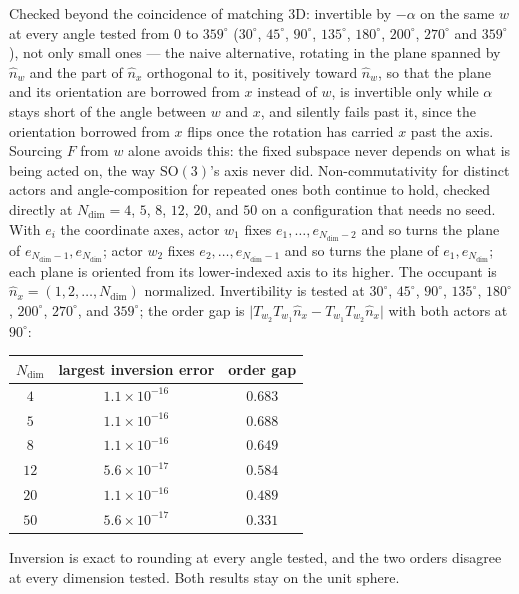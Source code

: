 \documentclass[12pt, a4paper]{article}
\begin{document}
Checked beyond the coincidence of matching 3D: invertible by $-\alpha$ on the same $w$ at every angle tested from $0$ to $359^\circ$ ($30^\circ$, $45^\circ$, $90^\circ$, $135^\circ$, $180^\circ$, $200^\circ$, $270^\circ$ and $359^\circ$), not only small ones --- the naive alternative, rotating in the plane spanned by $\hat n_w$ and the part of $\hat n_x$ orthogonal to it, positively toward $\hat n_w$, so that the plane and its orientation are borrowed from $x$ instead of $w$, is invertible only while $\alpha$ stays short of the angle between $w$ and $x$, and silently fails past it, since the orientation borrowed from $x$ flips once the rotation has carried $x$ past the axis. Sourcing $F$ from
$w$ alone avoids this: the fixed subspace never depends on what is
being acted on, the way $\mathrm{SO}(3)$'s axis never did.
Non-commutativity for distinct actors and angle-composition for
repeated ones both continue to hold, checked directly at
$N_{\mathrm{dim}}=4$, $5$, $8$, $12$, $20$, and $50$ on a
configuration that needs no seed. With $e_i$ the coordinate axes, actor $w_1$ fixes
$e_1,\ldots,e_{N_{\mathrm{dim}}-2}$ and so turns the plane of
$e_{N_{\mathrm{dim}}-1},e_{N_{\mathrm{dim}}}$; actor $w_2$ fixes
$e_2,\ldots,e_{N_{\mathrm{dim}}-1}$ and so turns the plane of
$e_1,e_{N_{\mathrm{dim}}}$; each plane is oriented from its
lower-indexed axis to its higher. The occupant is
$\hat n_x=(1,2,\ldots,N_{\mathrm{dim}})$ normalized. Invertibility is
tested at $30^\circ$, $45^\circ$, $90^\circ$, $135^\circ$,
$180^\circ$, $200^\circ$, $270^\circ$, and $359^\circ$; the order
gap is $\lvert T_{w_2}T_{w_1}\hat n_x-T_{w_1}T_{w_2}\hat n_x\rvert$
with both actors at $90^\circ$:
\begin{center}
\begin{tabular}{ccc}
$N_{\mathrm{dim}}$ & largest inversion error & order gap \\
\hline
$4$ & $1.1\times10^{-16}$ & $0.683$ \\
$5$ & $1.1\times10^{-16}$ & $0.688$ \\
$8$ & $1.1\times10^{-16}$ & $0.649$ \\
$12$ & $5.6\times10^{-17}$ & $0.584$ \\
$20$ & $1.1\times10^{-16}$ & $0.489$ \\
$50$ & $5.6\times10^{-17}$ & $0.331$ \\
\end{tabular}
\end{center}
Inversion is exact to rounding at every angle tested, and the two
orders disagree at every dimension tested. Both results stay on the unit sphere.
\end{document}

